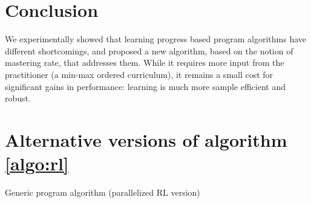 \documentclass{article}
\begin{document}

\section{Conclusion}
\label{sec:conclusion}
We experimentally showed that learning progress based program algorithms have different shortcomings, and proposed a new algorithm, based on the notion of mastering rate, that addresses them. While it requires more input from the practitioner (a min-max ordered curriculum), it remains a small cost for significant gains in performance: learning is much more sample efficient and robust. 





\clearpage


\clearpage

\appendix

\section{Alternative versions of algorithm \ref{algo:rl}}
\label{appendix:algos}

\begin{center}
\begin{algorithm}[H]
\label{algo:rl-parallel}
\caption{Generic program algorithm (parallelized RL version)}

\end{algorithm}
\end{center}
\end{document}
